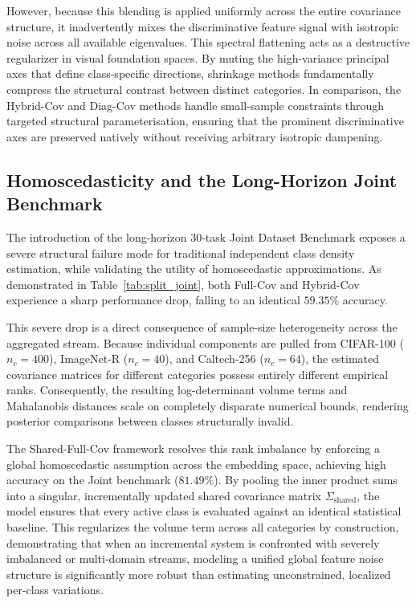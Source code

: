 However, because this blending is applied uniformly across the entire covariance structure, it inadvertently mixes the discriminative feature signal with isotropic noise across all available eigenvalues. This spectral flattening acts as a destructive regularizer in visual foundation spaces. By muting the high-variance principal axes that define class-specific directions, shrinkage methods fundamentally compress the structural contrast between distinct categories. In comparison, the Hybrid-Cov and Diag-Cov methods handle small-sample constraints through targeted structural parameterisation, ensuring that the prominent discriminative axes are preserved natively without receiving arbitrary isotropic dampening.

\subsection{Homoscedasticity and the Long-Horizon Joint Benchmark}
\label{sec:an:homoscedasticity}

The introduction of the long-horizon 30-task Joint Dataset Benchmark exposes a severe structural failure mode for traditional independent class density estimation, while validating the utility of homoscedastic approximations. As demonstrated in Table~\ref{tab:split_joint}, both Full-Cov and Hybrid-Cov experience a sharp performance drop, falling to an identical $59.35\%$ accuracy. 

This severe drop is a direct consequence of sample-size heterogeneity across the aggregated stream. Because individual components are pulled from CIFAR-100 ($n_c=400$), ImageNet-R ($n_c=40$), and Caltech-256 ($n_c=64$), the estimated covariance matrices for different categories possess entirely different empirical ranks. Consequently, the resulting log-determinant volume terms and Mahalanobis distances scale on completely disparate numerical bounds, rendering posterior comparisons between classes structurally invalid. 

The Shared-Full-Cov framework resolves this rank imbalance by enforcing a global homoscedastic assumption across the embedding space, achieving high accuracy on the Joint benchmark ($81.49\%$). By pooling the inner product sums into a singular, incrementally updated shared covariance matrix $\Sigma_{\text{shared}}$, the model ensures that every active class is evaluated against an identical statistical baseline. This regularizes the volume term across all categories by construction, demonstrating that when an incremental system is confronted with severely imbalanced or multi-domain streams, modeling a unified global feature noise structure is significantly more robust than estimating unconstrained, localized per-class variations.

